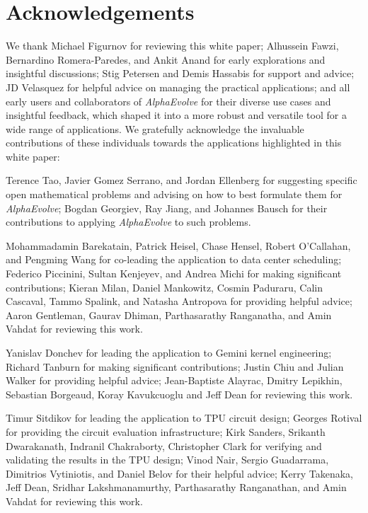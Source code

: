 \documentclass[logo,copyright,12pt]{googledeepmind}
\theoremstyle{definition}
\theoremstyle{remark}
\theoremstyle{plain}
\newcommand{\method}{\emph{AlphaEvolve}\xspace}
\begin{document}
\section*{Acknowledgements}
\label{sec:acknowledgements}

We thank  Michael Figurnov for reviewing this white paper; Alhussein Fawzi, Bernardino Romera-Paredes, and Ankit Anand for early explorations and insightful discussions; Stig Petersen and Demis Hassabis for support and advice;  JD Velasquez for helpful advice on managing the practical applications; and all early users and collaborators of \method for their diverse use cases and insightful feedback, which shaped it into a more robust and versatile tool for a wide range of applications. We gratefully acknowledge the invaluable contributions of these individuals towards the applications highlighted in this white paper:

Terence Tao, Javier Gomez Serrano, and Jordan Ellenberg for suggesting specific open mathematical problems and advising on how to best formulate them for \method; Bogdan Georgiev, Ray Jiang, and Johannes Bausch for their contributions to applying \method to such problems.

Mohammadamin Barekatain, Patrick Heisel, Chase Hensel, Robert O'Callahan, and Pengming Wang for co-leading the application to data center scheduling; Federico Piccinini, Sultan Kenjeyev, and Andrea Michi for making significant contributions; Kieran Milan, Daniel Mankowitz, Cosmin Paduraru, Calin Cascaval, Tammo Spalink, and Natasha Antropova for providing helpful advice; Aaron Gentleman, Gaurav Dhiman, Parthasarathy Ranganatha, and Amin Vahdat for reviewing this work.

Yanislav Donchev for leading the application to Gemini kernel engineering; Richard Tanburn for making significant contributions; Justin Chiu and Julian Walker for providing helpful advice; Jean-Baptiste Alayrac, Dmitry Lepikhin, Sebastian Borgeaud, Koray Kavukcuoglu and Jeff Dean for reviewing this work.

Timur Sitdikov for leading the application to TPU circuit design; Georges Rotival for providing the circuit evaluation infrastructure; Kirk Sanders, Srikanth Dwarakanath, Indranil Chakraborty, Christopher Clark for verifying and validating the results in the TPU design; Vinod Nair, Sergio Guadarrama, Dimitrios Vytiniotis, and Daniel Belov for their helpful advice; Kerry Takenaka, Jeff Dean, Sridhar Lakshmanamurthy, Parthasarathy Ranganathan, and Amin Vahdat for reviewing this work.
\end{document}
